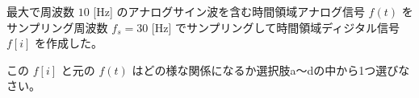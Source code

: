 最大で周波数 $10$ [Hz] のアナログサイン波を含む時間領域アナログ信号 $f(t)$ をサンプリング周波数 $f_s = 30$ [Hz] でサンプリングして時間領域ディジタル信号 $f[i]$ を作成した。\par
この $f[i]$ と元の $f(t)$ はどの様な関係になるか選択肢a〜dの中から1つ選びなさい。
